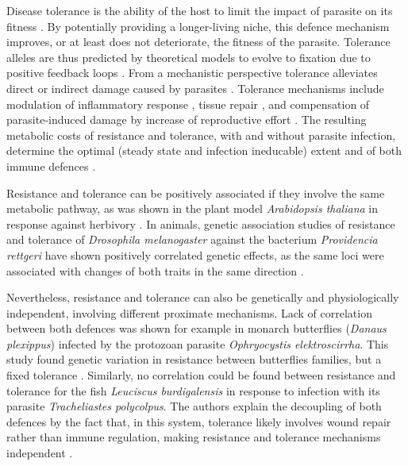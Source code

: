 Disease tolerance \parencite[not to be confused from "immunological tolerance" , unresponsiveness to self antigens;][]{medzhitov_disease_2012} is the ability of the host to limit the impact of parasite on its fitness \citep{raaberg_decomposing_2009, Vale2012, kutzer_maximising_2016}. By potentially providing a longer-living niche, this defence mechanism improves, or at least does not deteriorate, the fitness of the parasite. Tolerance alleles are thus predicted by theoretical models to evolve to fixation due to positive feedback loops \citep{Boots2008, restif_concurrent_2004, roy_evolutionary_2000}. From a mechanistic perspective tolerance alleviates direct or indirect \parencite[e.g. excessive immune response underlying resistance against parasites, called immunopathology;][]{graham_evolutionary_2005} damage caused by parasites \citep{raaberg_decomposing_2009}. Tolerance mechanisms include modulation of inflammatory response \citep{Ayres2012}, tissue repair \parencite[stress response, damage repair and cellular regeneration mechanisms;][]{soares_disease_2017}, and compensation of parasite‐induced damage by increase of reproductive effort \citep{Baucom2011}. The resulting metabolic costs of resistance and tolerance, with and without parasite infection, determine the optimal (steady state and infection ineducable) extent and of both immune defences \citep{sheldon_ecological_1996}.\par

Resistance and tolerance can be positively associated if they involve the same metabolic pathway, as was shown in the plant model \textit{Arabidopsis thaliana} in response against herbivory \citep{mesa_molecular_2017}. In animals, genetic association studies of resistance and tolerance of \textit{Drosophila melanogaster} against the bacterium \textit{Providencia rettgeri} have shown positively correlated genetic effects, as the same loci were associated with changes of both traits in the same direction \citep{howick_genetic_2017}.\par

Nevertheless, resistance and tolerance can also be genetically and physiologically independent, involving different proximate mechanisms. Lack of correlation between both defences was shown for example in monarch butterflies (\textit{Danaus plexippus}) infected by the protozoan parasite \textit{Ophryocystis elektroscirrha}. This study found genetic variation in resistance between butterflies families, but a fixed tolerance \citep{Lefvre2010}. Similarly, no correlation could be found between resistance and tolerance for the fish \textit{Leuciscus burdigalensis} in response to infection with its parasite \textit{Tracheliastes polycolpus}. The authors explain the decoupling of both defences by the fact that, in this system, tolerance likely involves wound repair rather than immune regulation, making resistance and tolerance mechanisms independent \citep{MazGuilmo2014}.\par

